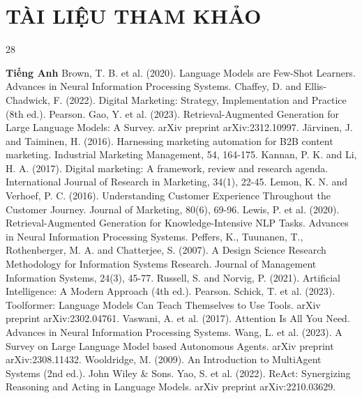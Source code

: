 \documentclass[a4paper]{article}
\begin{document}
\clearpage
\section*{TÀI LIỆU THAM KHẢO}
\renewcommand{\refname}{}
\begin{thebibliography}{28}

\item[]{\bfseries Tiếng Anh}\vspace{0.15cm}
 Brown, T. B. et al. (2020). Language Models are Few-Shot Learners. Advances in Neural Information Processing Systems.
 Chaffey, D. and Ellis-Chadwick, F. (2022). Digital Marketing: Strategy, Implementation and Practice (8th ed.). Pearson.
 Gao, Y. et al. (2023). Retrieval-Augmented Generation for Large Language Models: A Survey. arXiv preprint arXiv:2312.10997.
 Järvinen, J. and Taiminen, H. (2016). Harnessing marketing automation for B2B content marketing. Industrial Marketing Management, 54, 164-175.
 Kannan, P. K. and Li, H. A. (2017). Digital marketing: A framework, review and research agenda. International Journal of Research in Marketing, 34(1), 22-45.
 Lemon, K. N. and Verhoef, P. C. (2016). Understanding Customer Experience Throughout the Customer Journey. Journal of Marketing, 80(6), 69-96.
 Lewis, P. et al. (2020). Retrieval-Augmented Generation for Knowledge-Intensive NLP Tasks. Advances in Neural Information Processing Systems.
 Peffers, K., Tuunanen, T., Rothenberger, M. A. and Chatterjee, S. (2007). A Design Science Research Methodology for Information Systems Research. Journal of Management Information Systems, 24(3), 45-77.
 Russell, S. and Norvig, P. (2021). Artificial Intelligence: A Modern Approach (4th ed.). Pearson.
 Schick, T. et al. (2023). Toolformer: Language Models Can Teach Themselves to Use Tools. arXiv preprint arXiv:2302.04761.
 Vaswani, A. et al. (2017). Attention Is All You Need. Advances in Neural Information Processing Systems.
 Wang, L. et al. (2023). A Survey on Large Language Model based Autonomous Agents. arXiv preprint arXiv:2308.11432.
 Wooldridge, M. (2009). An Introduction to MultiAgent Systems (2nd ed.). John Wiley \& Sons.
 Yao, S. et al. (2022). ReAct: Synergizing Reasoning and Acting in Language Models. arXiv preprint arXiv:2210.03629.


\end{thebibliography}
\end{document}
